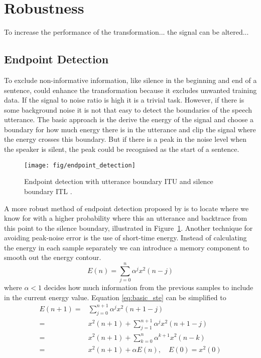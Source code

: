 \section{Robustness} %
\label{sec:robustness}
To increase the performance of the transformation... the signal can be altered...

\subsection{Endpoint Detection} %
\label{sub:endpoint_detection}
To exclude non-informative information, like silence in the beginning and end of a sentence, could enhance the transformation because it excludes unwanted training data. If the signal to noise ratio is high it is a trivial task. However, if there is some background noise it is not that easy to detect the boundaries of the speech utterance. The basic approach is the derive the energy of the signal and choose a boundary for how much energy there is in the utterance and clip the signal where the energy crosses this boundary. But if there is a peak in the noise level when the speaker is silent, the peak could be recognised as the start of a sentence.

\begin{figure}[htbp]
	\begin{center}
		\texttt{[image: fig/endpoint\_detection]}
		\caption{Endpoint detection with utterance boundary ITU and silence boundary ITL \cite{rabiner75}.}
		\label{fig:endpoint_detection}
	\end{center}
\end{figure}

A more robust method of endpoint detection proposed by \cite{rabiner75} is to locate where we know for with a higher probability where this an utterance and backtrace from this point to the silence boundary, illustrated in Figure~\ref{fig:endpoint_detection}. Another technique for avoiding peak-noise error is the use of short-time energy. Instead of calculating the energy in each sample separately we can introduce a memory component to smooth out the energy contour.
\begin{equation}
	E(n)=\sum_{j=0}^{n}\alpha^j x^2(n-j)
	\label{eq:basic_ste}
\end{equation}
where $\alpha < 1$ decides how much information from the previous samples to include in the current energy value. Equation \eqref{eq:basic_ste} can be simplified to
\begin{equation}
	\begin{split}
		E(n+1)=& \sum_{j=0}^{n+1}\alpha^jx^2(n+1-j)\\
		=& x^2(n+1)+\sum_{j=1}^{n+1}\alpha^jx^2(n+1-j)\\
		=& x^2(n+1)+\sum_{k=0}^{n}\alpha^{k+1} x^2(n-k)\\
		=& x^2(n+1)+\alpha E(n), \quad E(0)=x^2(0)\\
	\end{split}
	\label{eq:short_time_energy}
\end{equation}

